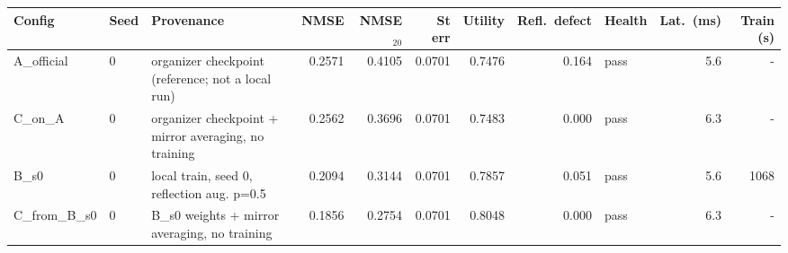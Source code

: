 \begin{tabular}{lllrrrrrlrr}
\toprule
Config & Seed & Provenance & NMSE & NMSE$_{20}$ & St err & Utility & Refl.\ defect & Health & Lat.\ (ms) & Train (s) \\
\midrule
A\_official & 0 & organizer checkpoint (reference; not a local run) & 0.2571 & 0.4105 & 0.0701 & 0.7476 & 0.164 & pass & 5.6 & - \\
C\_on\_A & 0 & organizer checkpoint + mirror averaging, no training & 0.2562 & 0.3696 & 0.0701 & 0.7483 & 0.000 & pass & 6.3 & - \\
B\_s0 & 0 & local train, seed 0, reflection aug. p=0.5 & 0.2094 & 0.3144 & 0.0701 & 0.7857 & 0.051 & pass & 5.6 & 1068 \\
C\_from\_B\_s0 & 0 & B\_s0 weights + mirror averaging, no training & 0.1856 & 0.2754 & 0.0701 & 0.8048 & 0.000 & pass & 6.3 & - \\
\bottomrule
\end{tabular}
